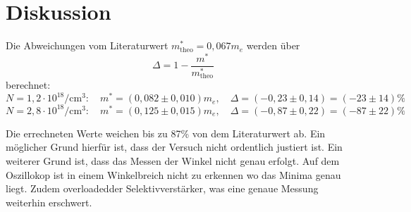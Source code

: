 \section{Diskussion}
\label{sec:Diskussion}
Die Abweichungen vom Literaturwert $m^*_\text{theo} = 0,067 m_e$ \cite{Galliumarsenid_me}
werden über 
\begin{equation*}
   \Delta =  1 - \frac{m^*}{m^*_\text{theo} }
\end{equation*}
\noindent berechnet:
\begin{equation*}
    N = 1,2 \cdot 10^{18} \si{\per\cubic\cm}: 
    \quad m^*=  (0,082 \pm 0,010)m_e,
    \quad \Delta = (-0,23\pm 0,14) = (-23 \pm 14) \%
\end{equation*}
\begin{equation*}
    N = 2,8 \cdot 10^{18} \si{\per\cubic\cm}: 
    \quad m^*= (0,125 \pm 0,015)m_e,
    \quad \Delta = (-0,87 \pm 0,22) = (- 87 \pm 22 ) \%
\end{equation*}

\noindent Die errechneten Werte weichen bis zu 87\% von dem Literaturwert ab.
Ein möglicher Grund hierfür ist, 
dass der Versuch nicht ordentlich justiert ist.
Ein weiterer Grund ist, 
dass das Messen der Winkel nicht genau erfolgt.
Auf dem Oszillokop ist in einem Winkelbreich nicht zu erkennen wo das Minima genau liegt.
Zudem \glqq overloaded\grqq der Selektivverstärker, was eine genaue Messung weiterhin erschwert.